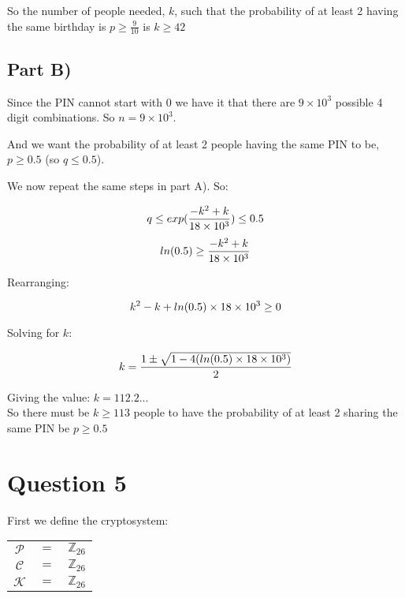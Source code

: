 \documentclass{article}
\numberwithin{equation}{subsection}
\begin{document}
	\vspace{5pt}
	So the number of people needed, $k$, such that the probability of at least 2 having the same birthday is $p\ge\frac{9}{10}$ is $k\ge42$

	\newpage
	\thispagestyle{fancy}
	
	\subsection*{Part B)}
	Since the PIN cannot start with $0$ we have it that there are $9\times 10^3$ possible 4 digit combinations. So $n=9\times10^3$.

	And we want the probability of at least 2 people having the same PIN to be, $p\ge0.5$ (so $q\le 0.5$).

	We now repeat the same steps in part A). So:

	\begin{equation}\notag
		q \le exp(\frac{-k^2+k}{18\times 10^3})	\le 0.5
	\end{equation}
	\begin{equation}\notag
		ln(0.5) \ge \frac{-k^2+k}{18\times 10^3}
	\end{equation}

	Rearranging:

	\begin{equation}\notag
		k^2-k+ln(0.5) \times 18\times  10^3 \ge 0
	\end{equation}

	Solving for $k$:

	\begin{equation}\notag
		k = \frac{1 \pm \sqrt{1-4(ln(0.5)\times18\times10^3)}}{2}
	\end{equation}

	Giving the value: $k=112.2...$\\
	So there must be $k\ge113$ people to have the probability of at least 2 sharing the same PIN be $p\ge0.5$

	\newpage
	\thispagestyle{fancy}

	\section*{Question 5}

	First we define the cryptosystem:

	\begin{tabular}{c c c}
		$\mathcal{P}$	&	$=$	&	$\mathbb{Z}_{26}$ \\
		$\mathcal{C}$	&	$=$	&	$\mathbb{Z}_{26}$\\
		$\mathcal{K}$	&	$=$	&	$\mathbb{Z}_{26}$\\
	\end{tabular}
\end{document}
